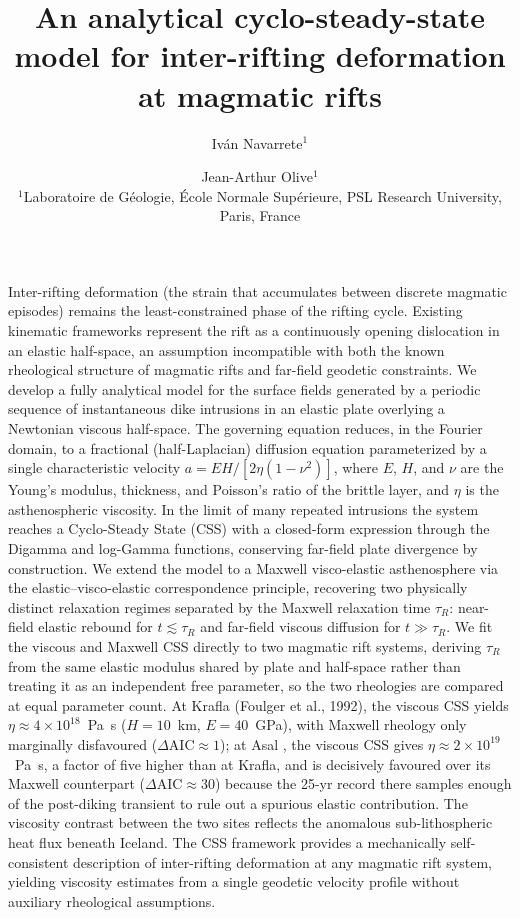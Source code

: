 \documentclass[extra]{gji}
\title[Navarrete \& Olive -- CSS inter-rifting model]
  {An analytical cyclo-steady-state model for inter-rifting deformation at magmatic rifts}
\author[Navarrete \& Olive]
  {Iv\'an Navarrete$^1$ \and Jean-Arthur Olive$^1$ \\
  $^1$Laboratoire de G\'eologie, \'Ecole Normale Sup\'erieure,
  PSL Research University, Paris, France
  }
\date{}
\begin{document}
\label{firstpage}
\maketitle

\begin{summary}
Inter-rifting deformation (the strain that accumulates between discrete
magmatic episodes) remains the least-constrained phase of the rifting
cycle. Existing kinematic frameworks represent the rift as a continuously
opening dislocation in an elastic half-space, an assumption incompatible
with both the known rheological structure of magmatic rifts and far-field
geodetic constraints. We develop a fully analytical model for the surface
fields generated by a periodic sequence of instantaneous dike intrusions
in an elastic plate overlying a Newtonian viscous half-space. The
governing equation reduces, in the Fourier domain, to a fractional
(half-Laplacian) diffusion equation parameterized by a single
characteristic velocity $a = EH/[2\eta(1-\nu^2)]$, where $E$, $H$, and
$\nu$ are the Young's modulus, thickness, and Poisson's ratio of the
brittle layer, and $\eta$ is the asthenospheric viscosity. In the limit of
many repeated intrusions the system reaches a Cyclo-Steady State (CSS)
with a closed-form expression through the Digamma and log-Gamma functions,
conserving far-field plate divergence by construction. We extend the
model to a Maxwell visco-elastic asthenosphere via the
elastic--visco-elastic correspondence principle, recovering two physically
distinct relaxation regimes separated by the Maxwell relaxation time
$\tau_R$: near-field elastic rebound for $t \lesssim \tau_R$ and
far-field viscous diffusion for $t \gg \tau_R$. We fit the viscous and Maxwell CSS directly to two magmatic rift
systems, deriving $\tau_R$ from the same elastic modulus shared by plate
and half-space rather than treating it as an independent free parameter,
so the two rheologies are compared at equal parameter count. At Krafla
(Foulger et al., 1992), the viscous CSS yields
$\eta \approx 4\times10^{18}$~Pa~s ($H = 10$~km, $E = 40$~GPa), with
Maxwell rheology only marginally disfavoured ($\Delta\mathrm{AIC} \approx 1$);
at Asal \citep{vigny2007twenty}, the viscous CSS gives
$\eta \approx 2\times10^{19}$~Pa~s, a factor of five higher than at
Krafla, and is decisively favoured over its Maxwell counterpart
($\Delta\mathrm{AIC} \approx 30$) because the 25-yr record there samples
enough of the post-diking transient to rule out a spurious elastic
contribution.  The viscosity contrast between the two sites reflects the
anomalous sub-lithospheric heat flux beneath Iceland. The CSS framework
provides a mechanically self-consistent description of inter-rifting
deformation at any magmatic rift system, yielding viscosity estimates
from a single geodetic velocity profile without auxiliary rheological
assumptions.
\end{summary}
\end{document}
